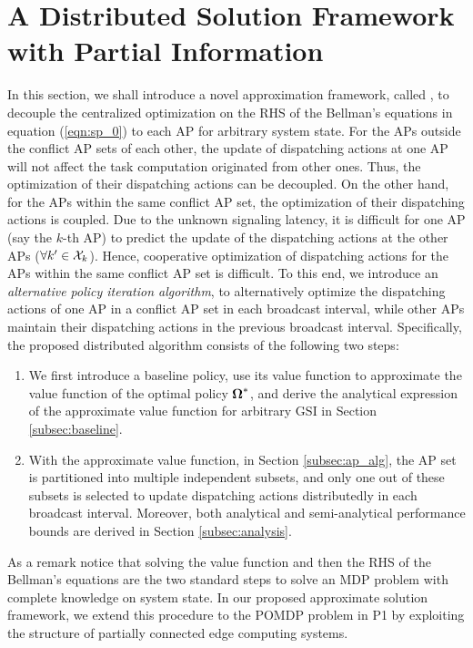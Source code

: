 \section{A Distributed Solution Framework with Partial Information}
\label{sec:algorithm}
In this section, we shall introduce a novel approximation framework, called \algname, to decouple the centralized optimization on the RHS of the Bellman's equations in equation (\ref{eqn:sp_0}) to each AP for arbitrary system state.
For the APs outside the conflict AP sets of each other, the update of dispatching actions at one AP will not affect the task computation originated from other ones.
Thus, the optimization of their dispatching actions can be decoupled.
On the other hand, for the APs within the same conflict AP set, the optimization of their dispatching actions is coupled.
Due to the unknown signaling latency, it is difficult for one AP (say the $k$-th AP) to predict the update of the dispatching actions at the other APs ($\forall k' \in\mathcal{X}_{k}$).
Hence, cooperative optimization of dispatching actions for the APs within the same conflict AP set is difficult. %
To this end, we introduce an \emph{alternative policy iteration algorithm}, to alternatively optimize the dispatching actions of one AP in a conflict AP set in each broadcast interval, while other APs maintain their dispatching actions in the previous broadcast interval.
Specifically, the proposed distributed algorithm consists of the following two steps:
\begin{enumerate}
    \item We first introduce a baseline policy, use its value function to approximate the value function of the optimal policy $\boldsymbol{\Omega}^*$, and derive the analytical expression of the approximate value function for arbitrary GSI in Section \ref{subsec:baseline}.
    \item With the approximate value function, in Section \ref{subsec:ap_alg}, the AP set is partitioned into multiple independent subsets,
    and only one out of these subsets is selected to update dispatching actions distributedly in each broadcast interval.
    Moreover, both analytical and semi-analytical performance bounds are derived in Section \ref{subsec:analysis}.
\end{enumerate}
As a remark notice that solving the value function and then the RHS of the Bellman's equations are the two standard steps to solve an MDP problem with complete knowledge on system state.
In our proposed approximate solution framework, we extend this procedure to the POMDP problem in P1 by exploiting the structure of partially connected edge computing systems.

